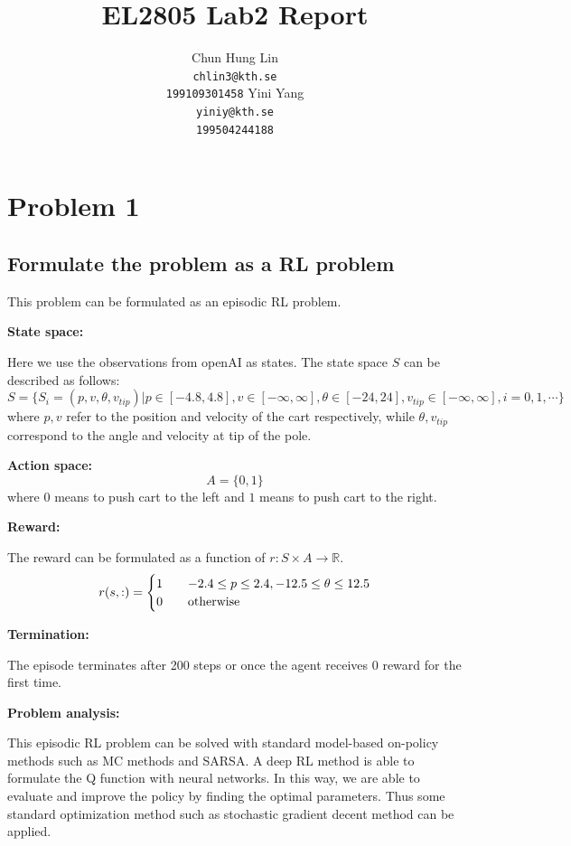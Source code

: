 \documentclass{article}
\title{EL2805 Lab2 Report}
\author{
  Chun Hung Lin \\
  \texttt{chlin3@kth.se} \\
  \texttt{199109301458}
  \And
  Yini Yang \\
  \texttt{yiniy@kth.se} \\
  \texttt{199504244188}
}
\begin{document}
\maketitle

\section{Problem 1}

\subsection{Formulate the problem as a RL problem}

This problem can be formulated as an episodic RL problem.

\textbf{State space:}

Here we use the observations from openAI as states. The state space $S$ can be described as follows:
$$ S = \{S_i=(p,v,\theta,v_{tip})|p\in[-4.8,4.8],v\in[-\infty,\infty],\theta\in[-24,24],v_{tip}\in[-\infty,\infty],i=0,1,\cdots\}$$
where $p,v$ refer to the position and velocity of the cart respectively, while $\theta,v_{tip}$ correspond to the angle and velocity at tip of the pole.

\textbf{Action space:}
$$A=\{0,1\}$$
where $0$ means to push cart to the left and $1$ means to push cart to the right.

\textbf{Reward:}

The reward can be formulated as a function of $r: S\times A\rightarrow \mathbb{R}$.
\begin{equation*}
  r(s, :) =
  \begin{cases}
    1  \quad &-2.4\leq p\leq 2.4, -12.5\leq \theta \leq 12.5\\
    0    \quad &\textup{otherwise}
  \end{cases}
\end{equation*}

\textbf{Termination:}

The episode terminates after 200 steps or once the agent receives 0 reward for the first time.

\textbf{Problem analysis:}

This episodic RL problem can be solved with standard model-based on-policy methods such as MC methods and SARSA.
A deep RL method is able to formulate the Q function with neural networks. In this way, we are able to evaluate and
improve the policy by finding the optimal parameters. Thus some standard optimization method such as stochastic gradient
decent method can be applied.
\end{document}
